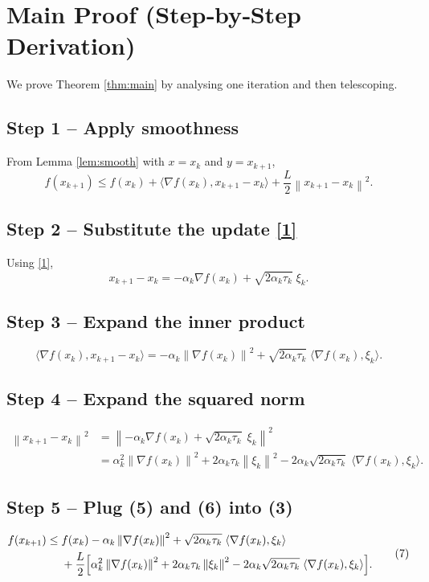 \documentclass{article}
\newcommand{\norm}[1]{\left\|#1\right\|}
\newcommand{\iprod}[2]{\langle #1,#2\rangle}
\begin{document}
\section*{Main Proof (Step‑by‑Step Derivation)}
We prove Theorem \ref{thm:main} by analysing one iteration and then telescoping.

\subsection*{Step 1 – Apply smoothness}
From Lemma \ref{lem:smooth} with $x=x_{k}$ and $y=x_{k+1}$,
\[
f(x_{k+1})\le f(x_{k})+\iprod{\nabla f(x_{k})}{x_{k+1}-x_{k}}
+\frac{L}{2}\norm{x_{k+1}-x_{k}}^{2}.
\tag{3}
\]

\subsection*{Step 2 – Substitute the update \eqref{1}}
Using \eqref{1},
\[
x_{k+1}-x_{k}= -\alpha_{k}\nabla f(x_{k})+\sqrt{2\alpha_{k}\tau_{k}}\;\xi_{k}.
\tag{4}
\]

\subsection*{Step 3 – Expand the inner product}
\[
\iprod{\nabla f(x_{k})}{x_{k+1}-x_{k}}
= -\alpha_{k}\norm{\nabla f(x_{k})}^{2}
+ \sqrt{2\alpha_{k}\tau_{k}}\;\iprod{\nabla f(x_{k})}{\xi_{k}}.
\tag{5}
\]

\subsection*{Step 4 – Expand the squared norm}
\[
\begin{aligned}
\norm{x_{k+1}-x_{k}}^{2}
&= \norm{-\alpha_{k}\nabla f(x_{k})+\sqrt{2\alpha_{k}\tau_{k}}\;\xi_{k}}^{2}\\
&= \alpha_{k}^{2}\norm{\nabla f(x_{k})}^{2}
+2\alpha_{k}\tau_{k}\norm{\xi_{k}}^{2}
-2\alpha_{k}\sqrt{2\alpha_{k}\tau_{k}}\;\iprod{\nabla f(x_{k})}{\xi_{k}}.
\end{aligned}
\tag{6}
\]

\subsection*{Step 5 – Plug (5) and (6) into (3)}
\[
\begin{aligned}
f(x_{k+1})\le&\;f(x_{k})
-\alpha_{k}\norm{\nabla f(x_{k})}^{2}
+ \sqrt{2\alpha_{k}\tau_{k}}\;\iprod{\nabla f(x_{k})}{\xi_{k}}\\
&\;+\frac{L}{2}\Bigl[
\alpha_{k}^{2}\norm{\nabla f(x_{k})}^{2}
+2\alpha_{k}\tau_{k}\norm{\xi_{k}}^{2}
-2\alpha_{k}\sqrt{2\alpha_{k}\tau_{k}}\;\iprod{\nabla f(x_{k})}{\xi_{k}}
\Bigr].
\end{aligned}
\tag{7}
\]
\end{document}
